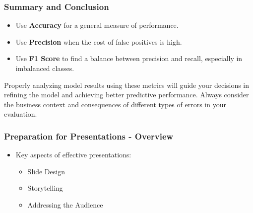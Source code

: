 \documentclass[aspectratio=169]{beamer}
\begin{document}
\begin{frame}[fragile]
    \frametitle{Summary and Conclusion}
    \begin{itemize}
        \item Use \textbf{Accuracy} for a general measure of performance.
        \item Use \textbf{Precision} when the cost of false positives is high.
        \item Use \textbf{F1 Score} to find a balance between precision and recall, especially in imbalanced classes.
    \end{itemize}
    Properly analyzing model results using these metrics will guide your decisions in refining the model and achieving better predictive performance. Always consider the business context and consequences of different types of errors in your evaluation.
\end{frame}

\begin{frame}[fragile]
    \frametitle{Preparation for Presentations - Overview}
    \begin{itemize}
        \item Key aspects of effective presentations:
        \begin{itemize}
            \item Slide Design
            \item Storytelling
            \item Addressing the Audience
        \end{itemize}
    \end{itemize}
\end{frame}
\end{document}
